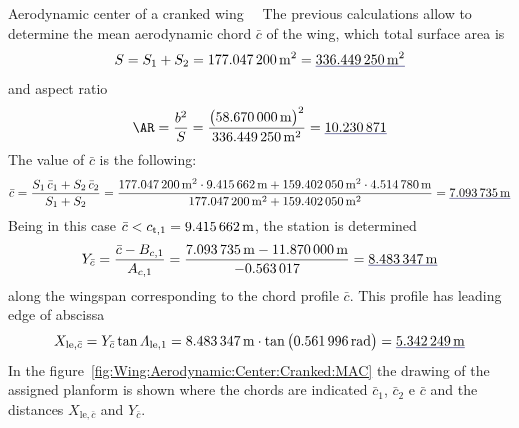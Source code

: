 \documentclass[[12pt,twoside]{book}
\begin{document}
\begin{myExampleX}{Aerodynamic center of a cranked wing}{\ \myIconGraph\ }
The previous calculations allow to determine the mean aerodynamic chord $\bar{c}$ of the wing,
which total surface area is
\[
S = S_1 + S_2
  = \SI[round-precision=1]{\myAreaWingIMTsquared}{\metre^2}
    = \mathunderline{mydarkblue}{
      \SI[round-precision=1]{\myAreaWingCrankedMTsquared}{\metre^2}
    }
\]
and aspect ratio
\[
\AR = \frac{b^2}{S} 
    = \frac{
        \big( \SI[round-precision=2]{\mySpanWingMT}{\meter} \big)^2
      }{
        \SI[round-precision=1]{\myAreaWingCrankedMTsquared}{\metre^2}
      }
    = \mathunderline{mydarkblue}{
      \SI[round-precision=2]{\myAspectRatioWingCranked}{}
    }
\]
The value of $\bar{c}$ is the following:
\[
\bar{c} = \frac{S_1 \, \bar{c}_1 + S_2 \, \bar{c}_2} {S_1 + S_2}
  =
  \frac{\SI[round-precision=1]{\myAreaWingIMTsquared}{\metre^2} \cdot \SI[round-precision=2]{\myMACWingIMT}{\metre} + \SI[round-precision=1]{\myAreaWingIIMTsquared}{\metre^2} \cdot \SI[round-precision=2]{\myMACWingIIMT}{\metre}}{\SI[round-precision=1]{\myAreaWingIMTsquared}{\metre^2} + \SI[round-precision=1]{\myAreaWingIIMTsquared}{\metre^2}}
    = \mathunderline{mydarkblue}{ \SI[round-precision=2]{\myMACWingCrankedMT}{\metre} }
\]
Being in this case
$\bar{c} < c_{\mathrm{t},1}=\SI[round-precision=2]{\myMACWingIMT}{\metre}$,
the station is determined
\[
  Y_{\bar{c}} 
    = \frac{\bar{c} - B_{c,1}}{A_{c,1}}
    = \frac{
        \SI[round-precision=2]{\myMACWingCrankedMT}{\metre} 
        - \SI[round-precision=2]{\myCoeffBChordWingIMT}{\metre}
      }{
        \SI[round-precision=3]{\myCoeffAChordWingI}{}
      }
    = \mathunderline{mydarkblue}{
      \SI[round-precision=2]{\myYYMACWingCrankedMT}{\metre}
    }
\]
along the wingspan corresponding to the chord profile $\bar{c}$. This profile
has leading edge of abscissa
\[
X_{\mathrm{le},\bar{c}} 
  = Y_{\bar{c}} \tan \Lambda_{\mathrm{le},1}
  =
   \SI[round-precision=2]{\myYYMACWingCrankedMT}{\metre}
   \cdot
	\tan \big( \SI[round-precision=3]{\mySweepLEWingIRAD}{\radian} \big)
	= \mathunderline{mydarkblue}{ \SI[round-precision=2]{\myXXMACLEToApexWingCrankedMT}{\metre} }
\]
% 
In the figure~\ref{fig:Wing:Aerodynamic:Center:Cranked:MAC}
the drawing of the assigned planform is shown where the chords are indicated $\bar{c}_1$, $\bar{c}_2$ e $\bar{c}$
and the distances $X_{\mathrm{le},\bar{c}}$ and $Y_{\bar{c}}$.


\end{myExampleX}
\end{document}
